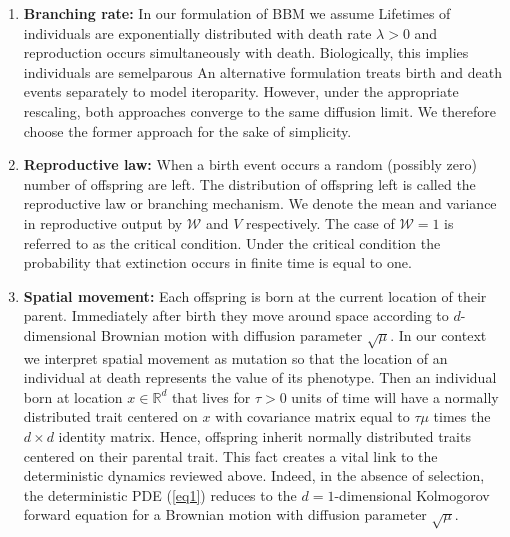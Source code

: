 \documentclass[]{article}
\begin{document}
\begin{enumerate}
\def\labelenumi{\arabic{enumi})}
\item
  \textbf{Branching rate:} In our formulation of BBM we assume Lifetimes
  of individuals are exponentially distributed with death rate
  \(\lambda>0\) and reproduction occurs simultaneously with death.
  Biologically, this implies individuals are semelparous An alternative
  formulation treats birth and death events separately to model
  iteroparity. However, under the appropriate rescaling, both approaches
  converge to the same diffusion limit. We therefore choose the former
  approach for the sake of simplicity.
\item
  \textbf{Reproductive law:} When a birth event occurs a random
  (possibly zero) number of offspring are left. The distribution of
  offspring left is called the reproductive law or branching mechanism.
  We denote the mean and variance in reproductive output by
  \(\mathscr{W}\) and \(V\) respectively. The case of \(\mathscr{W}=1\)
  is referred to as the critical condition. Under the critical condition
  the probability that extinction occurs in finite time is equal to one.
\item
  \textbf{Spatial movement:} Each offspring is born at the current
  location of their parent. Immediately after birth they move around
  space according to \(d\)-dimensional Brownian motion with diffusion
  parameter \(\sqrt\mu\). In our context we interpret spatial movement
  as mutation so that the location of an individual at death represents
  the value of its phenotype. Then an individual born at location
  \(x\in\mathbb{R}^d\) that lives for \(\tau>0\) units of time will have
  a normally distributed trait centered on \(x\) with covariance matrix
  equal to \(\tau\mu\) times the \(d\times d\) identity matrix. Hence,
  offspring inherit normally distributed traits centered on their
  parental trait. This fact creates a vital link to the deterministic
  dynamics reviewed above. Indeed, in the absence of selection, the
  deterministic PDE (\ref{eq1}) reduces to the \(d=1\)-dimensional
  Kolmogorov forward equation for a Brownian motion with diffusion
  parameter \(\sqrt\mu\).
\end{enumerate}
\end{document}
